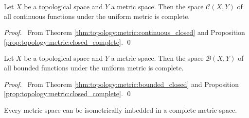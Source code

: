 \begin{thm}
  Let $X$ be a topological space and $Y$ a metric space. Then the space $\mathcal{C}(X, Y)$ of all continuous functions under the uniform metric is complete.
\end{thm}

\begin{proof}
  \pf\ From Theorem \ref{thm:topology:metric:continuous_closed} and Proposition \ref{prop:topology:metric:closed_complete}. \qed
\end{proof}

\begin{thm}
  \label{thm:topology:metric:bounded_complete}
  Let $X$ be a topological space and $Y$ a metric space. Then the space $\mathcal{B}(X, Y)$ of all bounded functions under the uniform metric is complete.
\end{thm}

\begin{proof}
  \pf\ From Theorem \ref{thm:topology:metric:bounded_closed} and Proposition \ref{prop:topology:metric:closed_complete}. \qed
\end{proof}

\begin{thm}
  \label{thm:topology:metric:imbed_in_complete}
  Every metric space can be isometrically imbedded in a complete metric space.
\end{thm}

